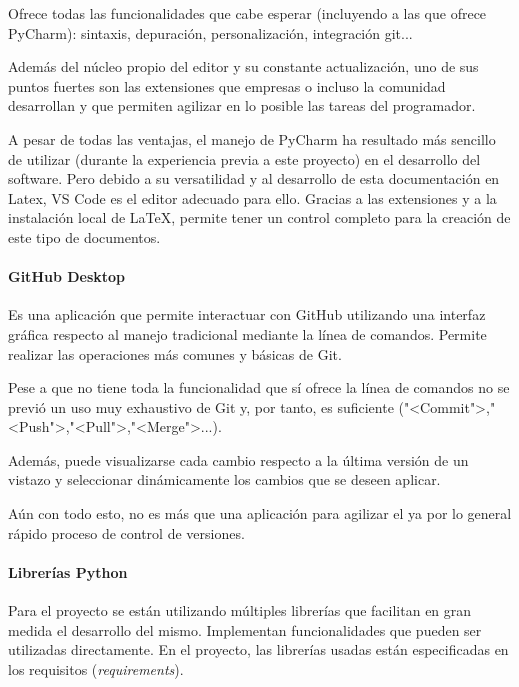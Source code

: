 Ofrece todas las funcionalidades que cabe esperar (incluyendo a las que ofrece
PyCharm): sintaxis, depuración, personalización, integración git...

Además del núcleo propio del editor y su constante actualización, uno de sus
puntos fuertes son las extensiones que empresas o incluso la comunidad
desarrollan y que permiten agilizar en lo posible las tareas del programador.

A pesar de todas las ventajas, el manejo de PyCharm ha resultado más sencillo de
utilizar (durante la experiencia previa a este proyecto) en el desarrollo del
software. Pero debido a su versatilidad y al desarrollo de esta
documentación en Latex, VS Code es el editor adecuado para ello. Gracias a las
extensiones y a la instalación local de \LaTeX, permite tener un control completo
para la creación de este tipo de documentos. 


\paragraph{GitHub Desktop}
Es una aplicación que permite interactuar con GitHub utilizando una interfaz
gráfica respecto al manejo tradicional mediante la línea de comandos. Permite
realizar las operaciones más comunes y básicas de Git.

Pese a que no tiene toda la funcionalidad que sí ofrece la línea de comandos no
se previó un uso muy exhaustivo de Git y, por tanto, es suficiente
("<Commit">,"<Push">,"<Pull">,"<Merge">...).

Además, puede visualizarse cada cambio respecto a la última versión de un
vistazo y seleccionar dinámicamente los cambios que se deseen aplicar.

Aún con todo esto, no es más que una aplicación para agilizar el ya por lo
general rápido proceso de control de versiones.

\paragraph{Librerías Python}
Para el proyecto se están utilizando múltiples librerías que facilitan en gran
medida el desarrollo del mismo. Implementan funcionalidades que pueden ser
utilizadas directamente. En el proyecto, las librerías usadas están
especificadas en los requisitos (\textit{requirements}).

